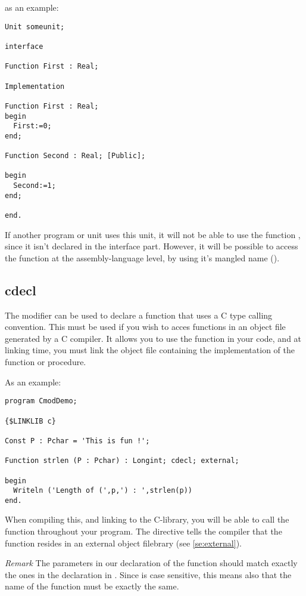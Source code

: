 \documentclass{report}
\begin{document}
as an example:
\begin{CodEx}
\begin{verbatim}
Unit someunit;

interface

Function First : Real;

Implementation

Function First : Real;
begin
  First:=0;
end;

Function Second : Real; [Public];

begin
  Second:=1;
end;

end.
\end{verbatim} 
\end{CodEx}
If another program or unit uses this unit, it will not be able to use the
function , since it isn't declared in the interface part.
However, it will be possible to access the function  at the
assembly-language level, by using it's mangled name (\progref).

\subsection{cdecl}
\label{se:cdecl}
The  modifier can be used to declare a function that uses a C
type calling convention. This must be used if you wish to acces functions in
an object file generated by a C compiler. It allows you to use the function in
your code, and at linking time, you must link the object file containing the
 implementation of the function or procedure.

As an example:
\begin{CodEx}
\begin{verbatim}
program CmodDemo;

{$LINKLIB c}

Const P : Pchar = 'This is fun !';

Function strlen (P : Pchar) : Longint; cdecl; external;

begin
  Writeln ('Length of (',p,') : ',strlen(p))
end.
\end{verbatim}
\end{CodEx}
When compiling this, and linking to the C-library, you will be able to call
the  function throughout your program. The 
directive tells the compiler that the function resides in an external
object filebrary (see \ref{se:external}). 

{\em Remark} The parameters in our declaration of the  function should 
match exactly the ones in the declaration in . Since  is case 
sensitive, this means also that the name of the
function must be exactly the same.
\end{document}
